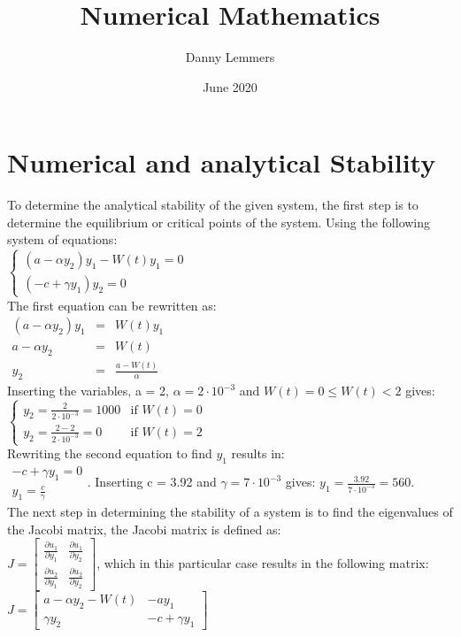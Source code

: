 \documentclass{article}
\title{Numerical Mathematics}
\author{Danny Lemmers}
\date{June 2020}
\begin{document}
\maketitle

\section{Numerical and analytical Stability}

To determine the analytical stability of the given system, the first step is to determine the equilibrium or critical points of the system. Using the following system of equations: \\[2ex] $\begin{cases}  ( a-\alpha y_{2}) y_{1} - W(t) y_{1}=0 \\
(-c + \gamma y_{1})y_{2}=0 \end{cases}$ \\[2ex] The first equation can be rewritten as:\\[2ex]
$\begin{array}{lll}
(a- \alpha y_{2}) y_{1} & = & W(t)y_{1}\\
a- \alpha y_{2} & = & W(t)\\
y_{2} & = & \frac{a-W(t)}{ \alpha }
\end{array}$\\[2ex]
Inserting the variables, a = 2, $\alpha = 2 \cdot 10^{-3}$ and $W(t) = 0 \leq W(t) < 2$ gives:\\[2ex]
$\begin{cases}
y_{2} = \frac{2}{2 \cdot 10^{-3}} = 1000 & \mbox{if } W(t) = 0\\
y_{2} = \frac{2-2}{2 \cdot 10^{-3}} = 0 & \mbox {if } W(t) = 2
\end{cases}$\\[2ex]
Rewriting the second equation to find $y_1$ results in:\\[2ex]
$\begin{array}{lll}
-c + \gamma y_{1} = 0\\
y_{1} = \frac{c}{ \gamma }
\end{array}$. Inserting c = 3.92 and $\gamma = 7 \cdot 10^{-3}$ gives: $y_{1} = \frac{3.92}{7 \cdot 10^{-3}} = 560$.\\[2ex]
The next step in determining the stability of a system is to find the eigenvalues of the Jacobi matrix, the Jacobi matrix is defined as: \\[2ex]
$J =\begin{bmatrix}
\frac{\partial u_1}{\partial y_1} &
	\frac{\partial u_1}{\partial y_2} \\[1ex]
\frac{\partial u_2}{\partial y_1} &
	\frac{\partial u_2}{\partial y_2}
\end{bmatrix}$, which in this particular case results in the following matrix:\\[2ex] $ J = \begin{bmatrix}
a-\alpha y_2-W(t) &
    -a y_1 \\[1ex]
\gamma y_2 &
    -c + \gamma y_1
\end{bmatrix}$\newpage
\end{document}
